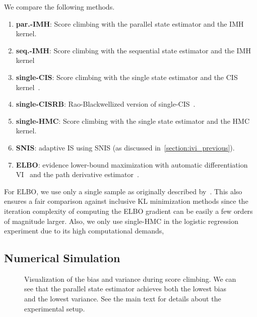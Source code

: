 We compare the following methods.
\vspace{-0.1in}
\begin{enumerate}[noitemsep]
  \item[\ding{182}] \textbf{par.-IMH}: Score climbing with the parallel state estimator and the IMH kernel. 
  \item[\ding{183}] \textbf{seq.-IMH}: Score climbing with the sequential state estimator and the IMH kernel 
  \item[\ding{184}] \textbf{single-CIS}: Score climbing with the single state estimator and the CIS kernel~\citep{NEURIPS2020_b2070693}.
  \item[\ding{185}] \textbf{single-CISRB}: Rao-Blackwellized version of single-CIS~\citep{NEURIPS2020_b2070693}.
  \item[\ding{184}] \textbf{single-HMC}: Score climbing with the single state estimator and the HMC kernel.
  \item[\ding{186}] \textbf{SNIS}: adaptive IS using SNIS (as discussed in~\cref{section:ivi_previous}).
  \item[\ding{187}] \textbf{ELBO}: evidence lower-bound maximization with automatic differentiation VI~\citep{pmlr-v33-ranganath14, JMLR:v18:16-107} and the path derivative estimator~\citep{NIPS2017_e91068ff}.
\end{enumerate}
\vspace{-0.05in}
For ELBO, we use only a single sample as originally described by~\citet{NIPS2017_e91068ff}.
This also ensures a fair comparison against inclusive KL minimization methods since the iteration complexity of computing the ELBO gradient can be easily a few orders of magnitude larger.
Also, we only use single-HMC in the logistic regression experiment due to its high computational demands, 


\subsection{Numerical Simulation}\label{section:simulation}
\begin{figure}
    \vspace{-0.2in}
    \centering
    
    \vspace{-0.2in}
    \caption{Visualization of the bias and variance during score climbing.
      We can see that the parallel state estimator achieves both the lowest bias and the lowest variance.
      See the main text for details about the experimental setup.
    }\label{fig:gaussian}
\end{figure}

